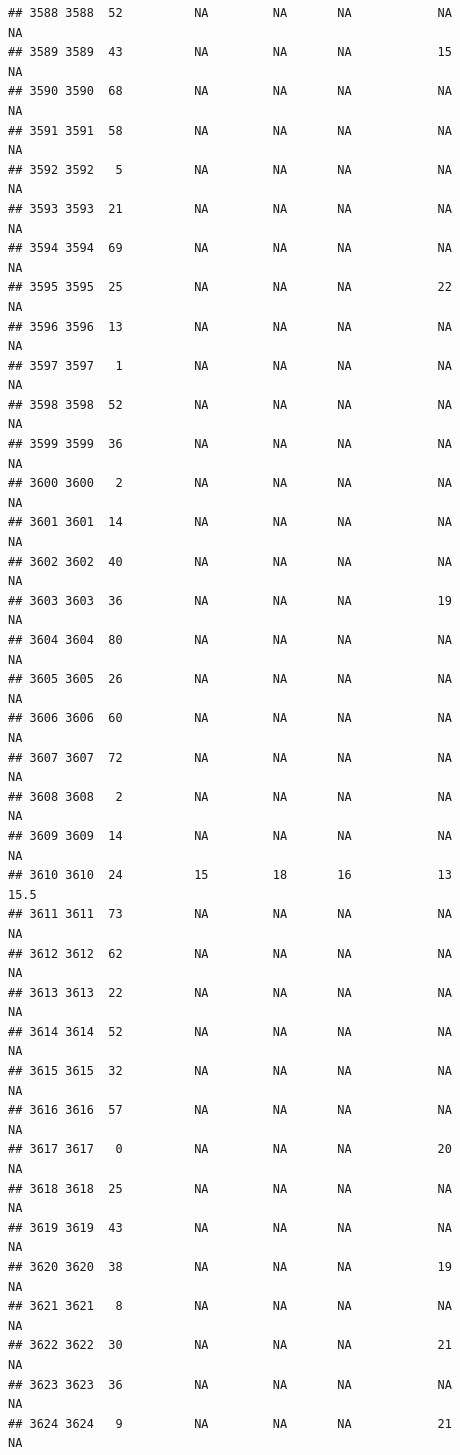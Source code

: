 \documentclass[man]{apa6}
\begin{document}
\begin{verbatim}
## 3588 3588  52          NA         NA       NA            NA       NA
## 3589 3589  43          NA         NA       NA            15       NA
## 3590 3590  68          NA         NA       NA            NA       NA
## 3591 3591  58          NA         NA       NA            NA       NA
## 3592 3592   5          NA         NA       NA            NA       NA
## 3593 3593  21          NA         NA       NA            NA       NA
## 3594 3594  69          NA         NA       NA            NA       NA
## 3595 3595  25          NA         NA       NA            22       NA
## 3596 3596  13          NA         NA       NA            NA       NA
## 3597 3597   1          NA         NA       NA            NA       NA
## 3598 3598  52          NA         NA       NA            NA       NA
## 3599 3599  36          NA         NA       NA            NA       NA
## 3600 3600   2          NA         NA       NA            NA       NA
## 3601 3601  14          NA         NA       NA            NA       NA
## 3602 3602  40          NA         NA       NA            NA       NA
## 3603 3603  36          NA         NA       NA            19       NA
## 3604 3604  80          NA         NA       NA            NA       NA
## 3605 3605  26          NA         NA       NA            NA       NA
## 3606 3606  60          NA         NA       NA            NA       NA
## 3607 3607  72          NA         NA       NA            NA       NA
## 3608 3608   2          NA         NA       NA            NA       NA
## 3609 3609  14          NA         NA       NA            NA       NA
## 3610 3610  24          15         18       16            13     15.5
## 3611 3611  73          NA         NA       NA            NA       NA
## 3612 3612  62          NA         NA       NA            NA       NA
## 3613 3613  22          NA         NA       NA            NA       NA
## 3614 3614  52          NA         NA       NA            NA       NA
## 3615 3615  32          NA         NA       NA            NA       NA
## 3616 3616  57          NA         NA       NA            NA       NA
## 3617 3617   0          NA         NA       NA            20       NA
## 3618 3618  25          NA         NA       NA            NA       NA
## 3619 3619  43          NA         NA       NA            NA       NA
## 3620 3620  38          NA         NA       NA            19       NA
## 3621 3621   8          NA         NA       NA            NA       NA
## 3622 3622  30          NA         NA       NA            21       NA
## 3623 3623  36          NA         NA       NA            NA       NA
## 3624 3624   9          NA         NA       NA            21       NA

\end{verbatim}
\end{document}
